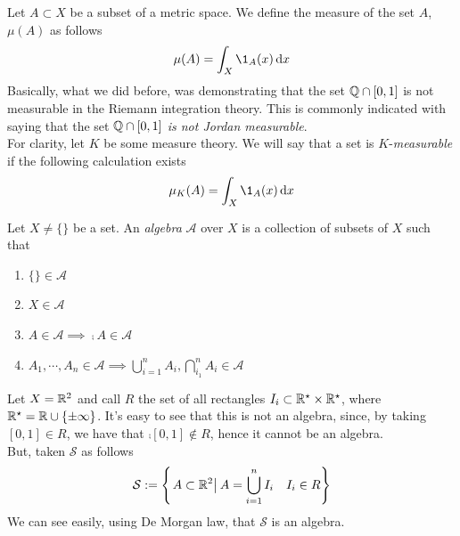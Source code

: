 \documentclass[../complete.tex]{subfiles}
\begin{document}
\begin{dfn}[Measure]
	Let $A\subset X$ be a subset of a metric space. We define the measure of the set $A$, $\mu(A)$ as follows
	\begin{equation}
		\mu(A)=\int_{X}^{}\1_A(x)\diff x
		\label{eq:measureset}
	\end{equation}
	Basically, what we did before, was demonstrating that the set $\mathbb{Q}\cap[0,1]$ is not measurable in the Riemann integration theory. This is commonly indicated with saying that the set $\mathbb{Q}\cap[0,1]$ \textit{is not Jordan measurable}.\\
	For clarity, let $K$ be some measure theory. We will say that a set is $K$-\textit{measurable} if the following calculation exists
	\begin{equation}
		\mu_K(A)=\int_{X}^{}\1_A(x)\diff x
		\label{eq:kmeasureset}
	\end{equation}
\end{dfn}
\begin{dfn}[Algebra]
	Let $X\ne\{\}$ be a set. An \textit{algebra} $\mathcal{A}$ over $X$ is a collection of subsets of $X$ such that
	\begin{enumerate}
	\item $\{\}\in\mathcal{A}$
	\item $X\in\mathcal{A}$
	\item $A\in\mathcal{A}\implies{}\comp{A}\in\mathcal{A}$
	\item $A_1,\cdots,A_n\in\mathcal{A}\implies{}\bigcup_{i=1}^nA_i,\bigcap_{i_1}^nA_i\in\mathcal{A}$
	\end{enumerate}
\end{dfn}
\begin{eg}
	Let $X=\mathbb{R}^2$ and call $R$ the set of all rectangles $I_i\subset\mathbb{R}^{\star}\times\mathbb{R}^\star$, where $\mathbb{R}^\star=\mathbb{R}\cup\{\pm\infty\}$. It's easy to see that this is not an algebra, since, by taking $[0,1]\in R$, we have that $\comp{[0,1]}\notin R$, hence it cannot be an algebra.\\
	But, taken $\mathcal{S}$ as follows
	\begin{equation*}
		\mathcal{S}:=\left\{\left.A\subset\mathbb{R}^2\right|_{}A=\bigcup_{i=1}^nI_i\quad I_i\in R\right\}
	\end{equation*}
	We can see easily, using De Morgan law, that $\mathcal{S}$ is an algebra.
\end{eg}
\end{document}
